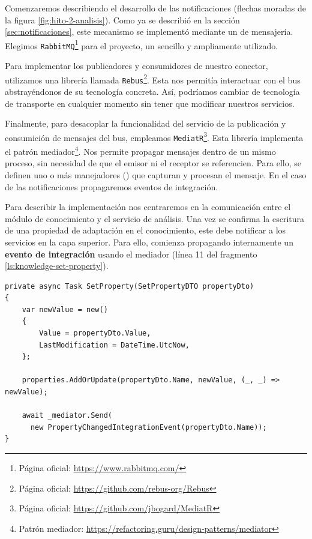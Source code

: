 Comenzaremos describiendo el desarrollo de las notificaciones (flechas moradas de la figura \ref{fig:hito-2-analisis}). Como ya se describió en la sección \ref{sec:notificaciones}, este mecanismo se implementó mediante un  de mensajería. Elegimos \texttt{RabbitMQ}\footnote{Página oficial: \url{https://www.rabbitmq.com/}} para el proyecto, un  sencillo y ampliamente utilizado. \cite{newmanBuildingMicroservicesDesigning2021}

Para implementar los publicadores y consumidores de nuestro conector, utilizamos una librería llamada \texttt{Rebus}\footnote{Página oficial: \url{https://github.com/rebus-org/Rebus}}. Esta nos permitía interactuar con el bus abstrayéndonos de su tecnología concreta. Así, podríamos cambiar de tecnología de transporte en cualquier momento sin tener que modificar nuestros servicios.

Finalmente, para desacoplar la funcionalidad del servicio de la publicación y consumición de mensajes del bus, empleamos \texttt{MediatR}\footnote{Página oficial: \url{https://github.com/jbogard/MediatR}}. Esta librería implementa el patrón mediador\footnote{Patrón mediador: \url{https://refactoring.guru/design-patterns/mediator}}. Nos permite propagar mensajes dentro de un mismo proceso, sin necesidad de que el emisor ni el receptor se referencien. Para ello, se definen uno o más manejadores () que capturan y procesan el mensaje. En el caso de las notificaciones propagaremos eventos de integración.

Para describir la implementación nos centraremos en la comunicación entre el módulo de conocimiento y el servicio de análisis. Una vez se confirma la escritura de una propiedad de adaptación en el conocimiento, este debe notificar a los servicios en la capa superior. Para ello, comienza propagando internamente un \textbf{evento de integración} usando el mediador (línea 11 del fragmento \ref{ls:knowledge-set-property}).

\begin{lstlisting}[caption={Implementación del método que asigna valor a una propiedad. Muestra un ejemplo de propagación interna de eventos de integración.\protect\footnotemark},captionpos=b, label=ls:knowledge-set-property]
private async Task SetProperty(SetPropertyDTO propertyDto)
{
    var newValue = new()
    {
        Value = propertyDto.Value,
        LastModification = DateTime.UtcNow,
    };

    properties.AddOrUpdate(propertyDto.Name, newValue, (_, _) => newValue);

    await _mediator.Send(
      new PropertyChangedIntegrationEvent(propertyDto.Name));
}

\end{lstlisting}

